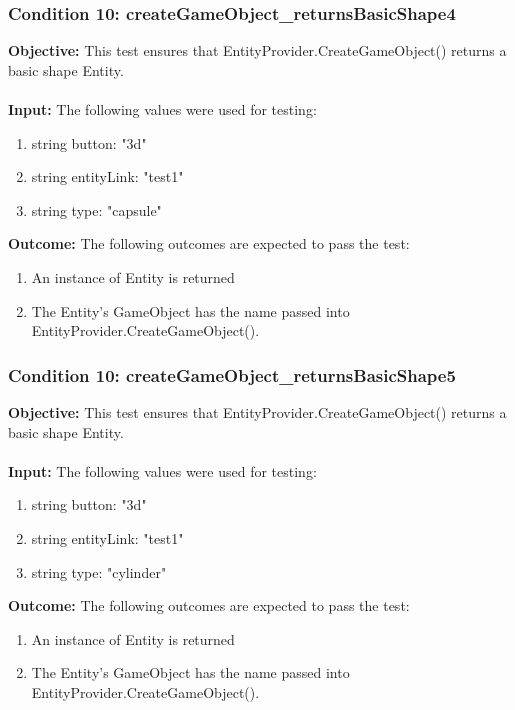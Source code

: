 \documentclass[a4paper,12pt]{article}
\begin{document}
		\subsubsection{Condition 10: createGameObject\_returnsBasicShape4}
			\textbf{Objective:} This test ensures that EntityProvider.CreateGameObject() returns a basic shape Entity.\\\\
			\textbf{Input:} The following values were used for testing:
				\begin{enumerate}
					\item string button: "3d"
					\item string entityLink: "test1"
					\item string type: "capsule"
				\end{enumerate}
			\textbf{Outcome:} The following outcomes are expected to pass the test:
				\begin{enumerate}
					\item An instance of Entity is returned
					\item The Entity's GameObject has the name passed into EntityProvider.CreateGameObject().
				\end{enumerate}
		\subsubsection{Condition 10: createGameObject\_returnsBasicShape5}
			\textbf{Objective:} This test ensures that EntityProvider.CreateGameObject() returns a basic shape Entity.\\\\
			\textbf{Input:} The following values were used for testing:
				\begin{enumerate}
					\item string button: "3d"
					\item string entityLink: "test1"
					\item string type: "cylinder"
				\end{enumerate}
			\textbf{Outcome:} The following outcomes are expected to pass the test:
				\begin{enumerate}
					\item An instance of Entity is returned
					\item The Entity's GameObject has the name passed into EntityProvider.CreateGameObject().
				\end{enumerate}
\end{document}
